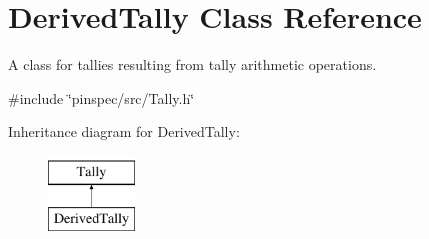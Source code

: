 \hypertarget{classDerivedTally}{\section{Derived\-Tally Class Reference}
\label{classDerivedTally}
}


A class for tallies resulting from tally arithmetic operations.  




{\ttfamily \#include \char`\"{}pinspec/src/\-Tally.\-h\char`\"{}}

Inheritance diagram for Derived\-Tally\-:\begin{figure}[H]
\begin{center}
\leavevmode
\includegraphics[height=2.000000cm]{classDerivedTally}
\end{center}
\end{figure}
